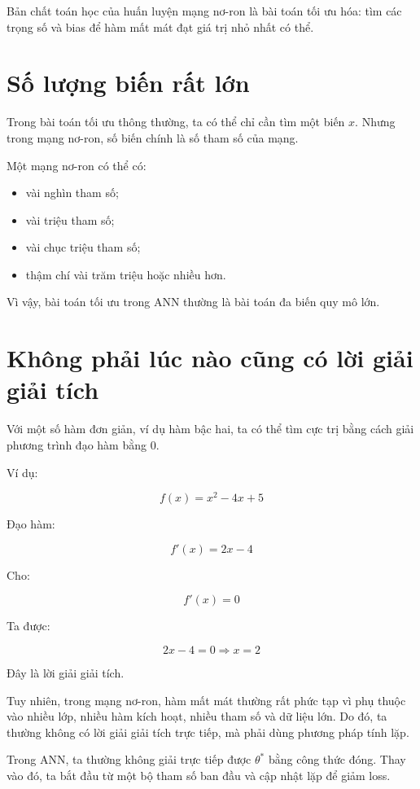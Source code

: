 \documentclass[12pt,a4paper]{report}
\begin{document}
\begin{ghinho}
Bản chất toán học của huấn luyện mạng nơ-ron là bài toán tối ưu hóa: tìm các trọng số và bias để hàm mất mát đạt giá trị nhỏ nhất có thể.
\end{ghinho}

\section{Số lượng biến rất lớn}

Trong bài toán tối ưu thông thường, ta có thể chỉ cần tìm một biến $x$. Nhưng trong mạng nơ-ron, số biến chính là số tham số của mạng.

Một mạng nơ-ron có thể có:

\begin{itemize}
    \item vài nghìn tham số;
    \item vài triệu tham số;
    \item vài chục triệu tham số;
    \item thậm chí vài trăm triệu hoặc nhiều hơn.
\end{itemize}

Vì vậy, bài toán tối ưu trong ANN thường là bài toán đa biến quy mô lớn.

\section{Không phải lúc nào cũng có lời giải giải tích}

Với một số hàm đơn giản, ví dụ hàm bậc hai, ta có thể tìm cực trị bằng cách giải phương trình đạo hàm bằng 0.

Ví dụ:

\[
    f(x) = x^2 - 4x + 5
\]

Đạo hàm:

\[
    f'(x) = 2x - 4
\]

Cho:

\[
    f'(x)=0
\]

Ta được:

\[
    2x-4=0 \Rightarrow x=2
\]

Đây là lời giải giải tích.

Tuy nhiên, trong mạng nơ-ron, hàm mất mát thường rất phức tạp vì phụ thuộc vào nhiều lớp, nhiều hàm kích hoạt, nhiều tham số và dữ liệu lớn. Do đó, ta thường không có lời giải giải tích trực tiếp, mà phải dùng phương pháp tính lặp.

\begin{ghinho}
Trong ANN, ta thường không giải trực tiếp được $\theta^*$ bằng công thức đóng. Thay vào đó, ta bắt đầu từ một bộ tham số ban đầu và cập nhật lặp để giảm loss.
\end{ghinho}
\end{document}
